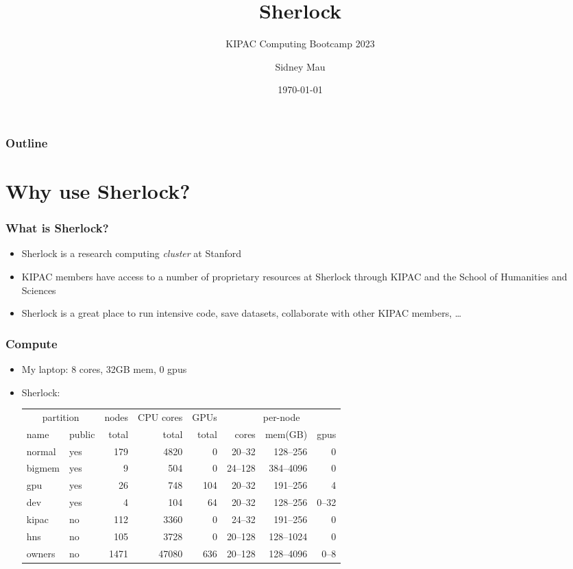 \documentclass[aspectratio=169]{beamer}
\title{Sherlock}
\subtitle{KIPAC Computing Bootcamp 2023}
\author[S. Mau]{Sidney Mau}
\institute[Stanford]{Stanford University}
\date[\today]{\today}
\begin{document}

\frame{\titlepage}

\begin{frame}
	\frametitle{Outline}
	\tableofcontents
\end{frame}


\section{Why use Sherlock?}

\frame{\sectionpage}

\begin{frame}
	\frametitle{What is Sherlock?}
	\begin{itemize}
		\item Sherlock is a research computing \emph{cluster} at Stanford
		\item KIPAC members have access to a number of proprietary resources at Sherlock through KIPAC and the School of Humanities and Sciences
		\item Sherlock is a great place to run intensive code, save datasets, collaborate with other KIPAC members, \dots
	\end{itemize}
\end{frame}

\begin{frame}
	\frametitle{Compute}
	\begin{itemize}
		\item My laptop: 8 cores, 32GB mem, 0 gpus
		\item Sherlock:
			\begin{center}
				\begin{tabular}{|l|l||r|r|r||r|r|r|}
					\hline
					\multicolumn{2}{|c||}{partition} & nodes & CPU cores & GPUs & \multicolumn{3}{|c|}{per-node} \\
					name   & public & total & total & total &   cores &   mem(GB) &  gpus \\
					\hline
					normal & yes    &   179 &  4820 &     0 &  20--32 &  128--256 &     0 \\
					bigmem & yes    &     9 &   504 &     0 & 24--128 & 384--4096 &     0 \\
					gpu    & yes    &    26 &   748 &   104 &  20--32 &  191--256 &     4 \\
					dev    & yes    &     4 &   104 &    64 &  20--32 &  128--256 & 0--32 \\
					\hline
					kipac  & no     &   112 &  3360 &     0 &  24--32 &  191--256 &     0 \\
					hns    & no     &   105 &  3728 &     0 & 20--128 & 128--1024 &     0 \\
					\hline
					owners & no     &  1471 & 47080 &   636 & 20--128 & 128--4096 &  0--8 \\
					\hline
				\end{tabular}
			\end{center}
	\end{itemize}
\end{frame}
\end{document}
